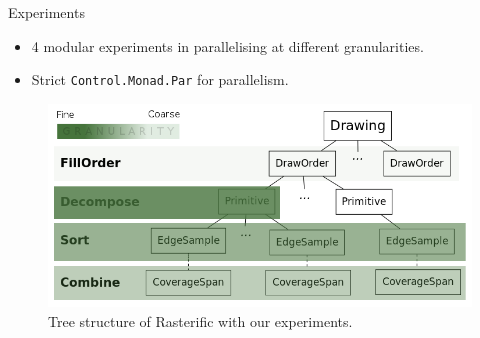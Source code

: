\documentclass[slidestop,compress,mathserif, xcolor=table]{beamer}
\begin{document}
\begin{frame}[c]{Experiments}
\begin{itemize}
\item 4 modular experiments in parallelising at different granularities.
\item Strict \texttt{Control.Monad.Par} for parallelism.
\end{itemize}
\begin{figure}
\centering
\includegraphics[width=0.9\linewidth]{../tree}
\caption{Tree structure of Rasterific with our experiments.}
\end{figure}
\end{frame}
\end{document}
